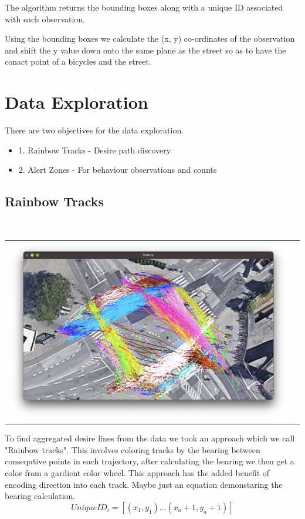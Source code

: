 \documentclass[
10pt, %
a4paper, %
oneside, %
headinclude,footinclude, %
] {book}%
\begin{document}
The algorithm returns the bounding boxes along with a unique ID associated with each observation.

Using the bounding boxes we calculate the (x, y) co-ordinates of the observation and shift the y value down onto 
the same plane as the street so as to have the conact point of a bicycles and the street.

\section{Data Exploration}

There are two objectives for the data exploration.
\begin{itemize}
	\item1. Rainbow Tracks - Desire path discovery
	\item2. Alert Zones - For behaviour observations and counts
\end{itemize}

\subsection{Rainbow Tracks}

\ \\ 
\noindent
\begin{tabular}{@{}cc}
\includegraphics[width=1.0\columnwidth]{rainbow.png} 
\end{tabular}
\label{Rainbow}

To find aggregated desire lines from the data we took an approach which we call "Rainbow tracks". This involves coloring tracks by the bearing between consequtive points in each 
trajectory, after calculating the bearing we then get a color from a gardient color wheel. This approach has the added benefit of encoding direction into 
each track.
Maybe just an equation demonstaring the bearing calculation.
\ \\ 
\begin{equation}
  UniqueID_i = [(x_1, y_1)...(x_a+1, y_a+1)]\label{eq:3}
\end{equation}
\end{document}
